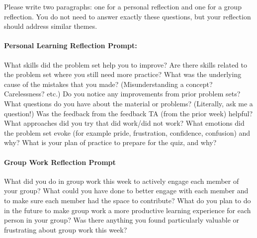 \documentclass[12pt]{article}
\begin{document}

{}%




\vspace{1cm}
Please write two paragraphs: one for a personal reflection and one for a group reflection. You do not need to answer exactly these questions, but your reflection should address similar themes.

\paragraph{Personal Learning Reflection Prompt:}
What skills did the problem set help you to improve? Are there skills related to the problem set where you still need more practice? What was the underlying cause of the mistakes that you made? (Misunderstanding a concept? Carelessness? etc.) Do you notice any improvements from prior problem sets? What questions do you have about the material or problems? (Literally, ask me a question!) Was the feedback from the feedback TA (from the prior week) helpful? What approaches did you try that did work/did not work? What emotions did the problem set evoke (for example pride, frustration, confidence, confusion) and why? What is your plan of practice to prepare for the quiz, and why?

\paragraph{Group Work Reflection Prompt} What did you do in group work this week to actively engage each member of your group? What could you have done to better engage with each member and to make sure each member had the space to contribute? What do you plan to do in the future to make group work a more productive learning experience for each person in your group? Was there anything you found particularly valuable or frustrating about group work this week?
\end{document}
